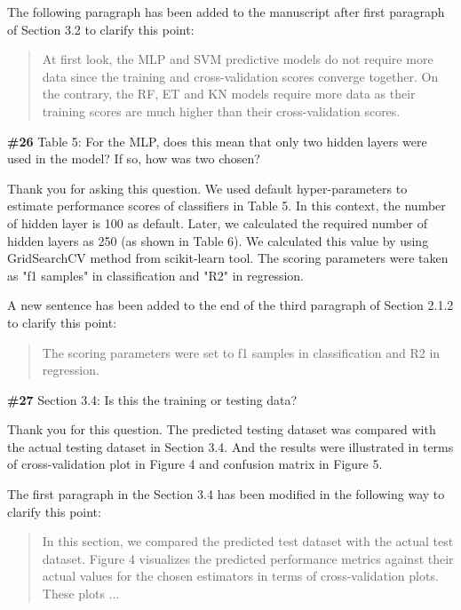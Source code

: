 \documentclass{ar2rc}
\begin{document}
    The following paragraph has been added to the manuscript after first paragraph of Section 3.2 to clarify this point:\\

    \begin{quote}
        At first look, the MLP and SVM predictive models do not require more data since the training and cross-validation scores converge together. On the contrary, the RF, ET and KN models require more data as their training scores are much higher than their cross-validation scores.
    \end{quote}


    \Comment \textbf{\#26} Table 5: For the MLP, does this mean that only two hidden layers
    were used in the model? If so, how was two chosen?

    \Response Thank you for asking this question. We used default hyper-parameters to estimate performance scores of classifiers in Table 5. In this context, the number of hidden layer is 100 as default. Later, we calculated the required number of hidden layers as 250 (as shown in Table 6). We calculated this value by using GridSearchCV method from scikit-learn tool. The scoring parameters were taken as "f1 samples" in classification and "R2" in regression.

    A new sentence has been added to the end of the third paragraph of Section 2.1.2 to clarify this point:\\

    \begin{quote}
        The scoring parameters were set to f1 samples in classification and R2 in regression.
    \end{quote}


    \Comment \textbf{\#27} Section 3.4: Is this the training or testing data?

    \Response Thank you for this question. The predicted testing dataset was compared with the actual testing dataset in Section 3.4. And the results were illustrated in terms of cross-validation plot in Figure 4 and confusion matrix in Figure 5.

    The first paragraph in the Section 3.4 has been modified in the following way to clarify this point:\\

    \begin{quote}
        In this section, we compared the predicted test dataset with the actual test dataset. Figure 4 visualizes the predicted performance metrics against their actual values for the chosen estimators in terms of cross-validation plots. These plots ...
    \end{quote}
\end{document}
